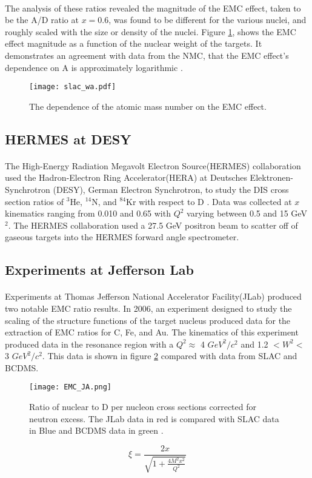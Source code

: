 \paragraph{} The analysis of these ratios revealed the magnitude of the EMC effect, taken to be the A/D ratio at $x=0.6$, was found to be different for the various nuclei, and roughly scaled with the size or density of the nuclei. Figure \ref{gomez_wa}, shows the EMC effect magnitude as a function of the nuclear weight of the targets. It demonstrates an agreement with data from the NMC, that the EMC effect's dependence on A is approximately logarithmic \cite{Ajth,gomez,seelyth}. 
\begin{figure}[h]
	\centering
	\texttt{[image: slac\_wa.pdf]} 
	\caption{The dependence of the atomic mass number on the EMC effect\cite{gomez}.}
	\label{gomez_wa}
\end{figure} 
\subsection{HERMES at DESY}
\paragraph{}
The High-Energy Radiation Megavolt Electron Source(HERMES) collaboration used the Hadron-Electron Ring Accelerator(HERA) at Deutsches Elektronen-Synchrotron (DESY), German Electron Synchrotron, to study the DIS cross section ratios of $^3$He, $^{14}$N, and $^{84}$Kr with respect to D \cite{HERMES_EMC}. Data was collected at $x$ kinematics ranging from 0.010 and 0.65 with $Q^2$ varying between 0.5 and 15 GeV$^2$\cite{HERMES_EMC}. The HERMES collaboration used a 27.5 GeV positron beam to scatter off of gaseous targets into the HERMES forward angle spectrometer. 
\subsection{Experiments at Jefferson Lab}
\paragraph{}Experiments at Thomas Jefferson National Accelerator Facility(JLab) produced two notable EMC ratio results. In 2006, an experiment designed to study the scaling of the structure functions of the target nucleus produced data for the extraction of EMC ratios for C, Fe, and Au. The kinematics of this experiment produced data in the resonance region with a $Q^2 \approx$ 4 $GeV^2/c^2$ and 1.2 $ < W^2 < $ 3 $GeV^2/c^2$. This data is shown in figure \ref{fig:EMCJA} compared with data from SLAC and BCDMS. 
\begin{figure}[t!]
	\centering
	\texttt{[image: EMC\_JA.png]} 
	\caption{Ratio of nuclear to D per nucleon cross sections corrected for neutron excess\cite{EMC_JA}. The JLab data in red is compared with SLAC data in Blue \cite{gomez} and BCDMS data in green \cite{BCDMS}.}
	\label{fig:EMCJA}
\end{figure} 
\begin{equation}
\xi = \frac{2x}{\sqrt{1 + \frac{4M^2x^2}{Q^2}}} \label{xi}
\end{equation}

